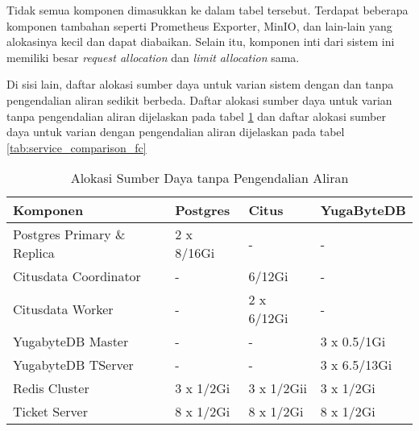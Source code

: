 Tidak semua komponen dimasukkan ke dalam tabel tersebut. Terdapat beberapa komponen tambahan seperti Prometheus Exporter, MinIO, dan lain-lain yang alokasinya kecil dan dapat diabaikan. Selain itu, komponen inti dari sistem ini memiliki besar \textit{request allocation} dan \textit{limit allocation} sama.

Di sisi lain, daftar alokasi sumber daya untuk varian sistem dengan dan tanpa pengendalian aliran sedikit berbeda. Daftar alokasi sumber daya untuk varian tanpa pengendalian aliran dijelaskan pada tabel \ref{tab:nofc-allocation} dan daftar alokasi sumber daya untuk varian dengan pengendalian aliran dijelaskan pada tabel \ref{tab:service_comparison_fc}


\begin{table}[htbp]
    \centering
    \caption{Alokasi Sumber Daya tanpa Pengendalian Aliran}
    \label{tab:nofc-allocation}
    \begin{tabular}{|l|l|l|l|}
        \hline
        \textbf{Komponen}           & \textbf{Postgres} & \textbf{Citus} & \textbf{YugaByteDB} \\ \hline
        Postgres Primary \& Replica & 2 x 8/16Gi        & -              & -                   \\ \hline
        Citusdata Coordinator       & -                 & 6/12Gi        & -                    \\ \hline
        Citusdata Worker            & -                 & 2 x 6/12Gi      & -                  \\ \hline
        YugabyteDB Master           & -                 & -              & 3 x 0.5/1Gi             \\ \hline
        YugabyteDB TServer          & -                 & -              & 3 x 6.5/13Gi            \\ \hline
        Redis Cluster               & 3 x 1/2Gi    & 3 x 1/2Gii & 3 x 1/2Gi                   \\ \hline
        Ticket Server              & 8 x 1/2Gi         & 8 x 1/2Gi      & 8 x 1/2Gi           \\ \hline
    \end{tabular}
\end{table}

\pagebreak


